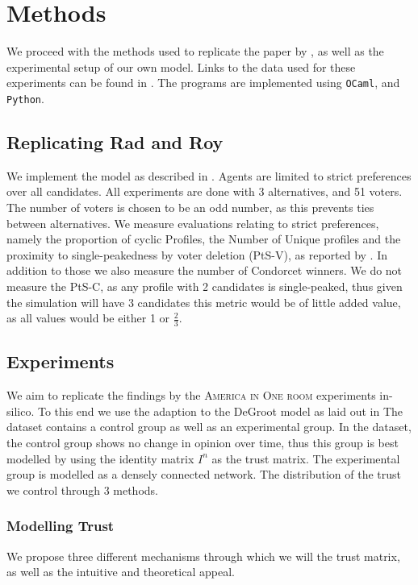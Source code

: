 \chapter{Methods}
\label{Methods}

We proceed with the methods used to replicate the paper by
\citet{radDeliberationSinglePeakednessCoherent2021}, as well as the
experimental setup of our own model. Links to the data used for these
experiments can be found in . The programs
are implemented using \texttt{OCaml}, and \texttt{Python}.


\section{Replicating Rad and Roy} We implement the model as described in
. Agents are limited to strict preferences over all
candidates. All experiments are done with 3 alternatives, and 51 voters. The
number of voters is chosen to be an odd number, as this prevents ties between
alternatives. We measure evaluations relating to strict preferences, namely the
proportion of cyclic Profiles, the Number of Unique profiles and the proximity
to single-peakedness by voter deletion (PtS-V), as reported by
\citet{radDeliberationSinglePeakednessCoherent2021}. In addition to those we
also measure the number of Condorcet winners. We do not measure the PtS-C, as
any profile with 2 candidates is single-peaked, thus given the simulation will have 3 candidates
this metric would be of little added value, as all values would be either 1 or $\frac{2}{3}$.

\section{Experiments}

We aim to replicate the findings by the \textsc{America in One room}
experiments \cite{fishkinCanDeliberationHave2024} in-silico. To this end we
use the adaption to the DeGroot model as laid out in 
The dataset contains a control group as well as an experimental group. In the
dataset, the control group shows no change in opinion over time,
thus this group is best modelled by using the identity matrix $I^n$ as the
trust matrix. The experimental group is modelled as a densely connected
network.  The distribution of the trust we control through 3 methods.

\subsection{Modelling Trust} We propose three different mechanisms through which we
will the trust matrix, as well as the intuitive and theoretical
appeal.


